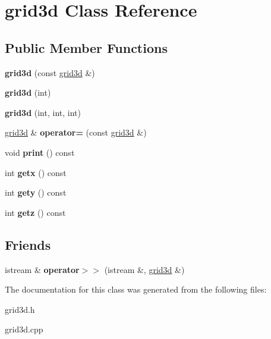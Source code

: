 \hypertarget{classgrid3d}{}\section{grid3d Class Reference}
\label{classgrid3d}
\subsection*{Public Member Functions}
\begin{DoxyCompactItemize}
\item 
{\bfseries grid3d} (const \hyperlink{classgrid3d}{grid3d} \&)\hypertarget{classgrid3d_a2a6918db46d0245fa5a57dc715068d43}{}\label{classgrid3d_a2a6918db46d0245fa5a57dc715068d43}

\item 
{\bfseries grid3d} (int)\hypertarget{classgrid3d_a8cd64ce0f8ba222c29adf43b98b09bbf}{}\label{classgrid3d_a8cd64ce0f8ba222c29adf43b98b09bbf}

\item 
{\bfseries grid3d} (int, int, int)\hypertarget{classgrid3d_a7e304629a3980eba63fa849921cfa4e4}{}\label{classgrid3d_a7e304629a3980eba63fa849921cfa4e4}

\item 
\hyperlink{classgrid3d}{grid3d} \& {\bfseries operator=} (const \hyperlink{classgrid3d}{grid3d} \&)\hypertarget{classgrid3d_a63fcecee82e5f496fcbe4eaf5b4ea1a4}{}\label{classgrid3d_a63fcecee82e5f496fcbe4eaf5b4ea1a4}

\item 
void {\bfseries print} () const \hypertarget{classgrid3d_a37bbf05d4ca34750c1d6c3a3180847d3}{}\label{classgrid3d_a37bbf05d4ca34750c1d6c3a3180847d3}

\item 
int {\bfseries getx} () const \hypertarget{classgrid3d_ab8658a122aed20a6f0d015f1e452fd00}{}\label{classgrid3d_ab8658a122aed20a6f0d015f1e452fd00}

\item 
int {\bfseries gety} () const \hypertarget{classgrid3d_adc9d6c88c073617cb246a57a20a959cb}{}\label{classgrid3d_adc9d6c88c073617cb246a57a20a959cb}

\item 
int {\bfseries getz} () const \hypertarget{classgrid3d_a54f92b74234aea27b60d956397bb74b6}{}\label{classgrid3d_a54f92b74234aea27b60d956397bb74b6}

\end{DoxyCompactItemize}
\subsection*{Friends}
\begin{DoxyCompactItemize}
\item 
istream \& {\bfseries operator$>$$>$} (istream \&, \hyperlink{classgrid3d}{grid3d} \&)\hypertarget{classgrid3d_a4f8205fd0f7add796096585e801b9151}{}\label{classgrid3d_a4f8205fd0f7add796096585e801b9151}

\end{DoxyCompactItemize}


The documentation for this class was generated from the following files\+:\begin{DoxyCompactItemize}
\item 
grid3d.\+h\item 
grid3d.\+cpp\end{DoxyCompactItemize}
